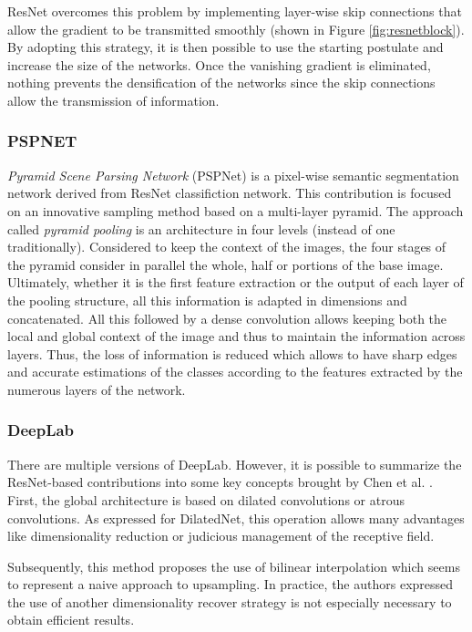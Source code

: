 ResNet overcomes this problem by implementing layer-wise skip connections that allow the gradient to be transmitted smoothly (shown in Figure \ref{fig:resnetblock}). By adopting this strategy, it is then possible to use the starting postulate and increase the size of the networks. Once the vanishing gradient is eliminated, nothing prevents the densification of the networks since the skip connections allow the transmission of information.

\subsubsection{PSPNET}

\emph{Pyramid Scene Parsing Network} (PSPNet) \cite{zhao2017pyramid} is a pixel-wise semantic segmentation network derived from ResNet classifiction network. 
This contribution is focused on an innovative sampling method based on a multi-layer pyramid. The approach called \emph{pyramid pooling} is an architecture in four levels (instead of one traditionally). Considered to keep the context of the images, the four stages of the pyramid consider in parallel the whole, half or portions of the base image. Ultimately, whether it is the first feature extraction or the output of each layer of the pooling structure, all this information is adapted in dimensions and concatenated. All this followed by a dense convolution allows keeping both the local and global context of the image and thus to maintain the information across layers. Thus, the loss of information is reduced which allows to have sharp edges and accurate estimations of the classes according to the features extracted by the numerous layers of the network.

\subsubsection{DeepLab}

There are multiple versions of DeepLab. However, it is possible to summarize the ResNet-based contributions into some key concepts brought by Chen et al. \cite{chen2018deeplab}.
First, the global architecture is based on dilated convolutions or atrous convolutions. As expressed for DilatedNet, this operation allows many advantages like dimensionality reduction or judicious management of the receptive field.

Subsequently, this method proposes the use of bilinear interpolation which seems to represent a naive approach to upsampling. In practice, the authors expressed the use of another dimensionality recover strategy is not especially necessary to obtain efficient results.

